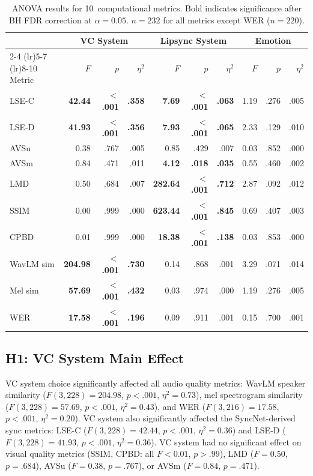 \documentclass[11pt,a4paper]{article}
\begin{document}
\begin{table}[htbp]
\centering
\caption{ANOVA results for 10~computational metrics. Bold indicates significance after BH FDR correction at $\alpha=0.05$. $n=232$ for all metrics except WER ($n=220$).}
\label{tab:anova}
\small
\begin{tabular}{@{}l rrr rrr rrr@{}}
\toprule
& \multicolumn{3}{c}{\textbf{VC System}} & \multicolumn{3}{c}{\textbf{Lipsync System}} & \multicolumn{3}{c}{\textbf{Emotion}} \\
\cmidrule(lr){2-4} \cmidrule(lr){5-7} \cmidrule(lr){8-10}
Metric & $F$ & $p$ & $\eta^2$ & $F$ & $p$ & $\eta^2$ & $F$ & $p$ & $\eta^2$ \\
\midrule
LSE-C   & \textbf{42.44} & \textbf{$<$.001} & \textbf{.358} & \textbf{7.69} & \textbf{$<$.001} & \textbf{.063} & 1.19 & .276 & .005 \\
LSE-D   & \textbf{41.93} & \textbf{$<$.001} & \textbf{.356} & \textbf{7.93} & \textbf{$<$.001} & \textbf{.065} & 2.33 & .129 & .010 \\
AVSu    & 0.38 & .767 & .005 & 0.85 & .429 & .007 & 0.03 & .852 & .000 \\
AVSm    & 0.84 & .471 & .011 & \textbf{4.12} & \textbf{.018} & \textbf{.035} & 0.55 & .460 & .002 \\
LMD     & 0.50 & .684 & .007 & \textbf{282.64} & \textbf{$<$.001} & \textbf{.712} & 2.87 & .092 & .012 \\
SSIM    & 0.00 & .999 & .000 & \textbf{623.44} & \textbf{$<$.001} & \textbf{.845} & 0.69 & .407 & .003 \\
CPBD    & 0.01 & .999 & .000 & \textbf{18.38} & \textbf{$<$.001} & \textbf{.138} & 0.03 & .853 & .000 \\
WavLM sim & \textbf{204.98} & \textbf{$<$.001} & \textbf{.730} & 0.14 & .868 & .001 & 3.29 & .071 & .014 \\
Mel sim & \textbf{57.69} & \textbf{$<$.001} & \textbf{.432} & 0.03 & .974 & .000 & 1.19 & .276 & .005 \\
WER     & \textbf{17.58} & \textbf{$<$.001} & \textbf{.196} & 0.09 & .911 & .001 & 0.15 & .700 & .001 \\
\bottomrule
\end{tabular}
\end{table}

\subsection{H1: VC System Main Effect}

VC system choice significantly affected all audio quality metrics: WavLM speaker similarity ($F(3,228)=204.98$, $p<.001$, $\eta^2=0.73$), mel spectrogram similarity ($F(3,228)=57.69$, $p<.001$, $\eta^2=0.43$), and WER ($F(3,216)=17.58$, $p<.001$, $\eta^2=0.20$).
VC system also significantly affected the SyncNet-derived sync metrics: LSE-C ($F(3,228)=42.44$, $p<.001$, $\eta^2=0.36$) and LSE-D ($F(3,228)=41.93$, $p<.001$, $\eta^2=0.36$).
VC system had no significant effect on visual quality metrics (SSIM, CPBD: all $F<0.01$, $p>.99$), LMD ($F=0.50$, $p=.684$), AVSu ($F=0.38$, $p=.767$), or AVSm ($F=0.84$, $p=.471$).
\end{document}
